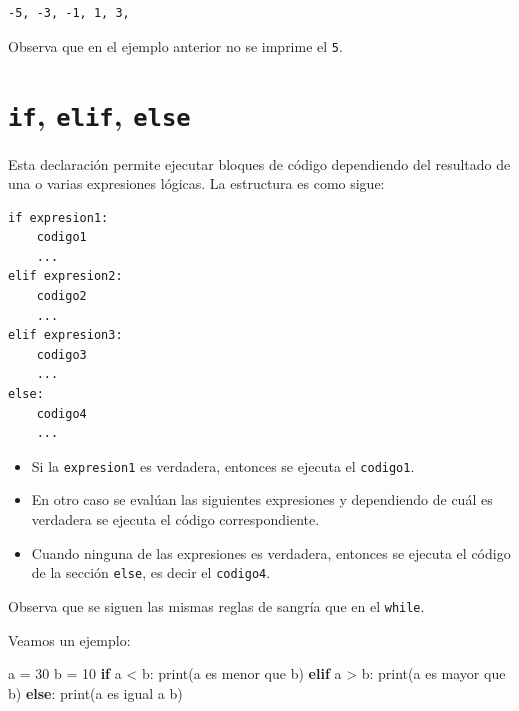 \documentclass[
  spanish,
  letterpaper,
]{scrbook}
\newenvironment{Shaded}{\begin{snugshade}}{\end{snugshade}}
\newcommand{\BuiltInTok}[1]{\textcolor[rgb]{0.00,0.23,0.31}{#1}}
\newcommand{\ControlFlowTok}[1]{\textcolor[rgb]{0.00,0.23,0.31}{\textbf{#1}}}
\newcommand{\DecValTok}[1]{\textcolor[rgb]{0.68,0.00,0.00}{#1}}
\newcommand{\NormalTok}[1]{\textcolor[rgb]{0.00,0.23,0.31}{#1}}
\newcommand{\OperatorTok}[1]{\textcolor[rgb]{0.37,0.37,0.37}{#1}}
\newcommand{\StringTok}[1]{\textcolor[rgb]{0.13,0.47,0.30}{#1}}
\providecommand{\tightlist}{%
  \setlength{\itemsep}{0pt}\setlength{\parskip}{0pt}}
\theoremstyle{definition}
\theoremstyle{remark}
\begin{document}
\begin{verbatim}
-5, -3, -1, 1, 3, 
\end{verbatim}

Observa que en el ejemplo anterior no se imprime el \texttt{5}.

\section{\texorpdfstring{\texttt{if}, \texttt{elif},
\texttt{else}}{if, elif, else}}\label{if-elif-else}

Esta declaración permite ejecutar bloques de código dependiendo del
resultado de una o varias expresiones lógicas. La estructura es como
sigue:

\begin{verbatim}
if expresion1:
    codigo1 
    ...
elif expresion2:
    codigo2 
    ...
elif expresion3:
    codigo3 
    ...
else:
    codigo4
    ...
\end{verbatim}

\begin{itemize}
\tightlist
\item
  Si la \texttt{expresion1} es verdadera, entonces se ejecuta el
  \texttt{codigo1}.
\item
  En otro caso se evalúan las siguientes expresiones y dependiendo de
  cuál es verdadera se ejecuta el código correspondiente.
\item
  Cuando ninguna de las expresiones es verdadera, entonces se ejecuta el
  código de la sección \texttt{else}, es decir el \texttt{codigo4}.
\end{itemize}

Observa que se siguen las mismas reglas de sangría que en el
\texttt{while}.

Veamos un ejemplo:

\begin{Shaded}
\begin{Highlighting}[]
\NormalTok{a }\OperatorTok{=} \DecValTok{30}
\NormalTok{b }\OperatorTok{=} \DecValTok{10}
\ControlFlowTok{if}\NormalTok{ a }\OperatorTok{\textless{}}\NormalTok{ b:}
    \BuiltInTok{print}\NormalTok{(}\StringTok{\textquotesingle{}a es menor que b\textquotesingle{}}\NormalTok{)}
\ControlFlowTok{elif}\NormalTok{ a }\OperatorTok{\textgreater{}}\NormalTok{ b:}
    \BuiltInTok{print}\NormalTok{(}\StringTok{\textquotesingle{}a es mayor que b\textquotesingle{}}\NormalTok{)}
\ControlFlowTok{else}\NormalTok{:}
    \BuiltInTok{print}\NormalTok{(}\StringTok{\textquotesingle{}a es igual a b\textquotesingle{}}\NormalTok{)}
\end{Highlighting}
\end{Shaded}
\end{document}
